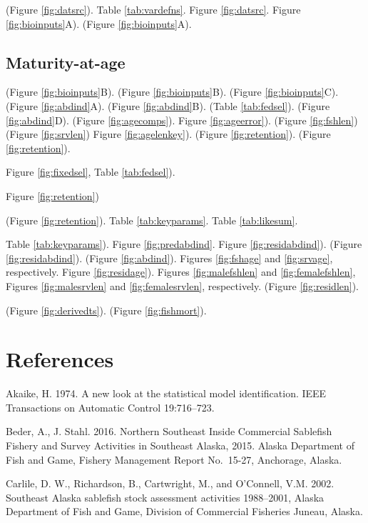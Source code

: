 \documentclass[
]{article}
\begin{document}
(Figure \ref{fig:datsrc}).
Table \ref{tab:vardefns}.
Figure \ref{fig:datsrc}.
Figure \ref{fig:bioinputs}A).
(Figure \ref{fig:bioinputs}A).

\hypertarget{maturity-at-age-1}{%
\subsection{Maturity-at-age}\label{maturity-at-age-1}}

(Figure \ref{fig:bioinputs}B).
(Figure \ref{fig:bioinputs}B).
(Figure \ref{fig:bioinputs}C).
(Figure \ref{fig:abdind}A).
(Figure \ref{fig:abdind}B).
(Table \ref{tab:fedsel}).
(Figure \ref{fig:abdind}D).
(Figure \ref{fig:agecomps}).
Figure \ref{fig:ageerror}).
(Figure \ref{fig:fshlen})
(Figure \ref{fig:srvlen})
Figure \ref{fig:agelenkey}).
(Figure \ref{fig:retention}).
(Figure \ref{fig:retention}).

Figure \ref{fig:fixedsel},
Table \ref{tab:fedsel}).

Figure \ref{fig:retention})

(Figure \ref{fig:retention}).
Table \ref{tab:keyparams}.
Table \ref{tab:likesum}.

Table \ref{tab:keyparams}).
Figure \ref{fig:predabdind}.
Figure \ref{fig:residabdind}).
(Figure \ref{fig:residabdind}).
(Figure \ref{fig:abdind}).
Figures \ref{fig:fshage} and \ref{fig:srvage}, respectively.
Figure \ref{fig:residage}).
Figures \ref{fig:malefshlen} and \ref{fig:femalefshlen},
Figures \ref{fig:malesrvlen} and \ref{fig:femalesrvlen}, respectively.
(Figure \ref{fig:residlen}).

(Figure \ref{fig:derivedts}).
(Figure \ref{fig:fishmort}).

\hypertarget{references}{%
\section{References}\label{references}}

Akaike, H. 1974. A new look at the statistical model identification. IEEE Transactions on Automatic Control 19:716--723.

Beder, A., J. Stahl. 2016. Northern Southeast Inside Commercial Sablefish Fishery and Survey Activities in Southeast Alaska, 2015. Alaska Department of Fish and Game, Fishery Management Report No.~15-27, Anchorage, Alaska.

Carlile, D. W., Richardson, B., Cartwright, M., and O'Connell, V.M. 2002. Southeast Alaska sablefish stock assessment activities 1988--2001, Alaska Department of Fish and Game, Division of Commercial Fisheries Juneau, Alaska.
\end{document}
